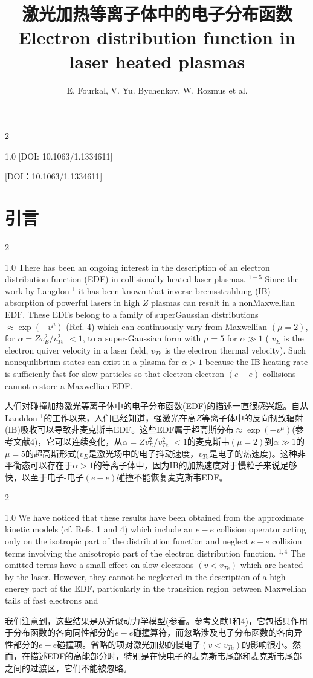 \documentclass[oneside,onecolumn]{article}
\date{}
\title{激光加热等离子体中的电子分布函数\\ \Large{Electron distribution function in laser heated plasmas}}  \author{E. Fourkal,  V. Yu. Bychenkov,   W. Rozmus et al.}
\newcommand\enzhbox[2]{
	\quad\par \begin{paracol}{2} 
			\begin{spacing}{1.0}
					\footnotesize  #1
			\end{spacing}
			
		\switchcolumn[1] 
		#2
	\end{paracol} 
}
\begin{document}
  \begin{sloppypar}
  
  \maketitle
  
  

\enzhbox{  [DOI: 10.1063/1.1334611]
}{
[DOI：10.1063/1.1334611]
}
  
  \section{引言}
 \enzhbox{There has been an ongoing interest in the description of an electron distribution function (EDF) in collisionally heated laser plasmas. ${ }^{1-5}$ Since the work by Langdon ${ }^{1}$ it has been known that inverse bremsstrahlung (IB) absorption of powerful lasers in high $Z$ plasmas can result in a nonMaxwellian EDF. These EDFs belong to a family of superGaussian distributions $\approx \exp \left(-v^{\mu}\right)$ (Ref. 4) which can continuously vary from Maxwellian $(\mu=2)$, for $\alpha=Z v_{E}^{2} / v_{T e}^{2}$ $<1$, to a super-Gaussian form with $\mu=5$ for $\alpha \gg 1$ ( $v_{E}$ is the electron quiver velocity in a laser field, $v_{T e}$ is the electron thermal velocity). Such nonequilibrium states can exist in a plasma for $\alpha>1$ because the IB heating rate is sufficienly fast for slow particles so that electron-electron $(e-e)$ collisions cannot restore a Maxwellian EDF.
}{人们对碰撞加热激光等离子体中的电子分布函数(EDF)的描述一直很感兴趣。自从Landdon ${ }^{1}$的工作以来，人们已经知道，强激光在高$Z$等离子体中的反向韧致辐射(IB)吸收可以导致非麦克斯韦EDF。这些EDF属于超高斯分布$\approx \exp \left(-v^{\mu}\right)$(参考文献4)，它可以连续变化，从$\alpha=Z v_{E}^{2} / v_{T e}^{2}$ $<1$的麦克斯韦$(\mu=2)$到$\alpha \gg 1$的$\mu=5$的超高斯形式($v_{E}$是激光场中的电子抖动速度，$v_{T e}$是电子的热速度)。这种非平衡态可以存在于$\alpha>1$的等离子体中，因为IB的加热速度对于慢粒子来说足够快，以至于电子-电子$(e-e)$碰撞不能恢复麦克斯韦EDF。
}
  

\enzhbox{  We have noticed that these results have been obtained from the approximate kinetic models (cf. Refs. 1 and 4) which include an $e-e$ collision operator acting only on the isotropic part of the distribution function and neglect $e-e$ collision terms involving the anisotropic part of the electron distribution function. ${ }^{1,4}$ The omitted terms have a small effect on slow electrons $\left(v<v_{T e}\right)$ which are heated by the laser. However, they cannot be neglected in the description of a high energy part of the EDF, particularly in the transition region between Maxwellian tails of fast electrons and
}{
我们注意到，这些结果是从近似动力学模型(参看。参考文献1和4)，它包括只作用于分布函数的各向同性部分的$e-e$碰撞算符，而忽略涉及电子分布函数的各向异性部分的$e-e$碰撞项。省略的项对激光加热的慢电子$\left(v<v_{T e}\right)$的影响很小。然而，在描述EDF的高能部分时，特别是在快电子的麦克斯韦尾部和麦克斯韦尾部之间的过渡区，它们不能被忽略。
}
  


\end{sloppypar}
\end{document}
